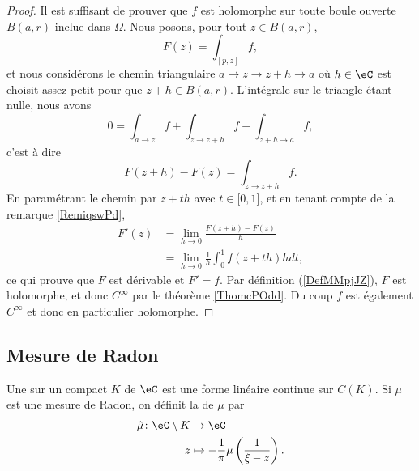 \begin{proof}
    Il est suffisant de prouver que \( f\) est holomorphe sur toute boule ouverte \( B(a,r)\) inclue dans \( \Omega\). Nous posons, pour tout \( z\in B(a,r)\),
    \begin{equation}
        F(z)=\int_{[p,z]}f,
    \end{equation}
    et nous considérons le chemin triangulaire \( a\to z\to z+h\to a\) où \( h\in \eC\) est choisit assez petit pour que \( z+h\in B(a,r)\). L'intégrale sur le triangle étant nulle, nous avons
    \begin{equation}
        0=\int_{a\to z}f+\int_{z\to z+h}f+\int_{z+h\to a}f,
    \end{equation}
    c'est à dire
    \begin{equation}
        F(z+h)-F(z)=\int_{z\to z+h}f.
    \end{equation}
    En paramétrant le chemin par \( z+th\) avec \( t\in\mathopen[ 0 , 1 \mathclose]\), et en tenant compte de la remarque \ref{RemiqswPd},
    \begin{subequations}
        \begin{align}
            F'(z)&=\lim_{h\to 0} \frac{ F(z+h)-F(z) }{ h }\\
            &=\lim_{h\to 0} \frac{1}{ h }\int_0^1f(z+th)hdt,
        \end{align}
    \end{subequations}
    ce qui prouve que \( F\) est dérivable et \( F'=f\). Par définition (\ref{DefMMpjJZ}), \( F\) est holomorphe, et donc \( C^{\infty}\) par le théorème \ref{ThomcPOdd}. Du coup \( f\) est également \(  C^{\infty}\) et donc en particulier holomorphe.
\end{proof}

\subsection{Mesure de Radon}

\begin{definition}
    Une  sur un compact \(  K\) de \( \eC\) est une forme linéaire continue sur \( C(K)\). Si \( \mu\) est une mesure de Radon, on définit la  de \( \mu\) par 
    \begin{equation}
        \begin{aligned}
            \hat \mu\colon \eC\setminus K&\to \eC \\
            z&\mapsto -\frac{1}{ \pi }\mu\left( \frac{1}{ \xi-z } \right). 
        \end{aligned}
    \end{equation}
\end{definition}


